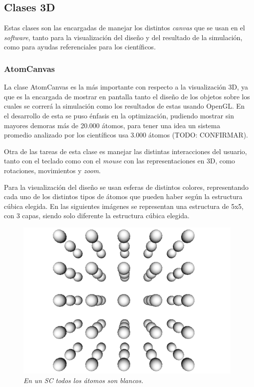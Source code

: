 \subsection{Clases 3D}

Estas clases son las encargadas de manejar los distintos \emph{canvas} que se usan en el \emph{software}, tanto para la visualización del diseño y del resultado de la simulación, como para ayudas referenciales para los científicos.

\subsubsection{AtomCanvas}

La clase AtomCanvas es la más importante con respecto a la visualización 3D, ya que es la encargada de mostrar en pantalla tanto el diseño de los objetos sobre los cuales se correrá la simulación como los resultados de estas usando OpenGL. En el desarrollo de esta se puso énfasis en la optimización, pudiendo mostrar sin mayores demoras más de 20.000 átomos, para tener una idea un sistema promedio analizado por los científicos usa 3.000 átomos (TODO: CONFIRMAR).

Otra de las tareas de esta clase es manejar las distintas interacciones del usuario, tanto con el teclado como con el \emph{mouse} con las representaciones en 3D, como rotaciones, movimientos y \emph{zoom}.

Para la visualización del diseño se usan esferas de distintos colores, representando cada uno de los distintos tipos de átomos que pueden haber según la estructura cúbica elegida. En las siguientes imágenes se representan una estructura de 5x5, con 3 capas, siendo solo diferente la estructura cúbica elegida.

\begin{figure}[H]
  \centering
  \includegraphics[scale=.3]{images/atomCanvas-SC}
  \caption{\em En un SC todos los átomos son blancos.}
\end{figure}

